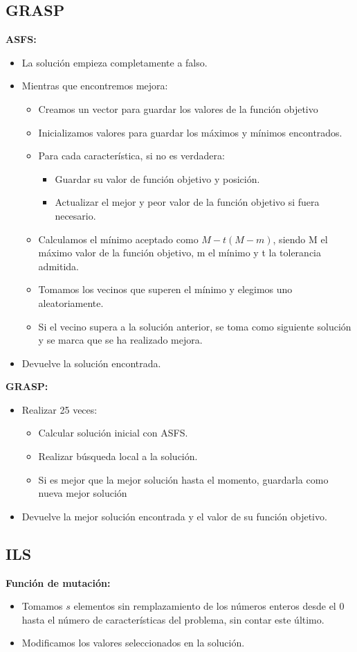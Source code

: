 \subsection{GRASP}
\textbf{ASFS:}
\begin{itemize}
\item La solución empieza completamente a falso.
\item Mientras que encontremos mejora:
\begin{itemize}
\item Creamos un vector para guardar los valores de la función objetivo
\item Inicializamos valores para guardar los máximos y mínimos encontrados.
\item Para cada característica, si no es verdadera:
\begin{itemize}
\item Guardar su valor de función objetivo y posición.
\item Actualizar el mejor y peor valor de la función objetivo si fuera necesario.
\end{itemize}
\item Calculamos el mínimo aceptado como $M-t(M-m)$, siendo M el máximo valor de la función objetivo, m el mínimo y t la tolerancia admitida.
\item Tomamos los vecinos que superen el mínimo y elegimos uno aleatoriamente.
\item Si el vecino supera a la solución anterior, se toma como siguiente solución y se marca que se ha realizado mejora.
\end{itemize}
\item Devuelve la solución encontrada.
\end{itemize}

\textbf{GRASP:}
\begin{itemize}
\item Realizar 25 veces:
\begin{itemize}
\item Calcular solución inicial con ASFS.
\item Realizar búsqueda local a la solución.
\item Si es mejor que la mejor solución hasta el momento, guardarla como nueva mejor solución
\end{itemize} 
\item Devuelve la mejor solución encontrada y el valor de su función objetivo.
\end{itemize} 
\newpage
\subsection{ILS}
\textbf{Función de mutación:}
\begin{itemize}
\item Tomamos $s$ elementos sin remplazamiento de los números enteros desde el 0 hasta el número de características del problema, sin contar este último.  
\item Modificamos los valores seleccionados en la solución.
\end{itemize} 

